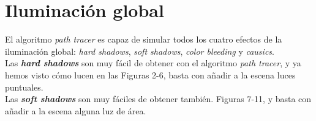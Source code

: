 \documentclass{article}
\begin{document}
\newpage

\section{Iluminación global}

El algoritmo \textit{path tracer} es capaz de simular todos los cuatro efectos
de la iluminación global: \textit{hard shadows}, \textit{soft shadows},
\textit{color bleeding} y \textit{causics}. \\

Las \textbf{\textit{hard shadows}} son muy fácil de obtener con el algoritmo
\textit{path tracer}, y ya hemos visto cómo lucen en las Figuras 2-6, basta con
añadir a la escena luces puntuales. \\

Las \textbf{\textit{soft shadows}} son muy fáciles de obtener también. Figuras
7-11, y basta con añadir a la escena alguna luz de área. \\
\end{document}
